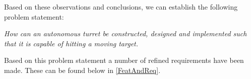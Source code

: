 Based on these observations and conclusions, we can establish the following
problem statement:

\begin{center}
\colorbox{diff}{
\begin{minipage}{0.8\linewidth}
\textit{How can an autonomous turret be constructed, designed and implemented
such that it is capable of hitting a moving target.}
\end{minipage}
}
\end{center}

Based on this problem statement a number of refined requirements have been made.
These can be found below in \autoref{FeatAndReq}. 
